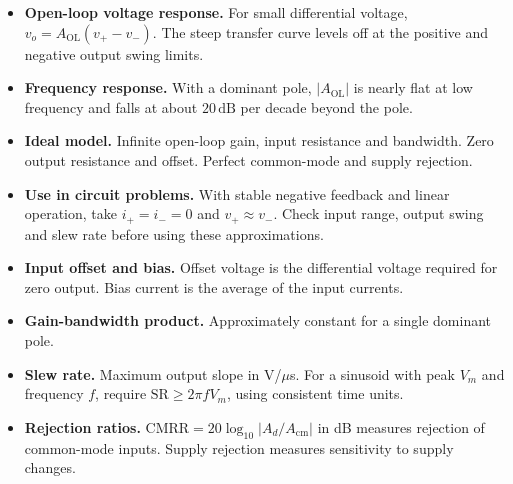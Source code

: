 \documentclass[12pt,a4paper]{article}
\begin{document}
\begin{itemize}[leftmargin=*, itemsep=3pt, topsep=4pt]
  \item \textbf{Open-loop voltage response.} For small differential voltage, \(v_o=A_{\mathrm{OL}}(v_+-v_-)\). The steep transfer curve levels off at the positive and negative output swing limits.
  \item \textbf{Frequency response.} With a dominant pole, \(\lvert A_{\mathrm{OL}}\rvert\) is nearly flat at low frequency and falls at about \(20\,\mathrm{dB}\) per decade beyond the pole.
  \item \textbf{Ideal model.} Infinite open-loop gain, input resistance and bandwidth. Zero output resistance and offset. Perfect common-mode and supply rejection.
  \item \textbf{Use in circuit problems.} With stable negative feedback and linear operation, take \(i_+=i_-=0\) and \(v_+\approx v_-\). Check input range, output swing and slew rate before using these approximations.
\end{itemize}

\begin{itemize}[leftmargin=*, itemsep=3pt, topsep=4pt]
  \item \textbf{Input offset and bias.} Offset voltage is the differential voltage required for zero output. Bias current is the average of the input currents.
  \item \textbf{Gain-bandwidth product.} Approximately constant for a single dominant pole.
  \item \textbf{Slew rate.} Maximum output slope in V/\(\mu\)s. For a sinusoid with peak \(V_m\) and frequency \(f\), require \(\mathrm{SR}\ge 2\pi f V_m\), using consistent time units.
  \item \textbf{Rejection ratios.} \(\mathrm{CMRR}=20\log_{10}\lvert A_d/A_{\mathrm{cm}}\rvert\) in dB measures rejection of common-mode inputs. Supply rejection measures sensitivity to supply changes.
\end{itemize}
\end{document}
